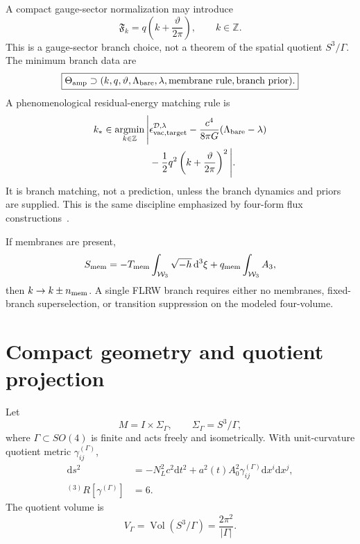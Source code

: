 \documentclass[
  aps,
  prd,
  reprint,
  superscriptaddress,
  floatfix,
  nofootinbib,
  longbibliography
]{revtex4-2}
\theoremstyle{plain}
\theoremstyle{definition}
\theoremstyle{remark}
\newcommand{\dd}{\mathrm d}
\newcommand{\D}{\mathcal D}
\newcommand{\Vol}{\operatorname{Vol}}
\newcommand{\Fcal}{\mathfrak F}
\newcommand{\Z}{\mathbb Z}
\begin{document}
A compact gauge-sector normalization may introduce
\begin{equation}
\boxed{
\Fcal_k=q\left(k+\frac{\vartheta}{2\pi}\right),
\qquad
k\in\Z.
}
\label{eq:flux_branch}
\end{equation}
This is a gauge-sector branch choice, not a theorem of the spatial quotient \(S^3/\Gamma\).  The minimum branch data are
\begin{equation}
\boxed{
\Theta_{\rm amp}\supset(k,q,\vartheta,\Lambda_{\rm bare},\lambda,
\text{membrane rule},\text{branch prior}).
}
\label{eq:branch_data}
\end{equation}
A phenomenological residual-energy matching rule is
\begin{equation}
\begin{aligned}
k_*\in\operatorname*{argmin}_{k\in\Z}
\Bigg|&\epsilon_{\rm vac,target}^{\D,\lambda}
-\frac{c^4}{8\pi G}(\Lambda_{\rm bare}-\lambda)\\
&-\frac12q^2\left(k+\frac{\vartheta}{2\pi}\right)^2\Bigg|.
\end{aligned}
\label{eq:branch_match}
\end{equation}
It is branch matching, not a prediction, unless the branch dynamics and priors are supplied.  This is the same discipline emphasized by four-form flux constructions~\cite{BrownTeitelboim1987,BoussoPolchinski2000}.

If membranes are present,
\begin{equation}
S_{\rm mem}=-T_{\rm mem}\int_{\mathcal W_3}\sqrt{-h}\,\dd^3\xi+q_{\rm mem}\int_{\mathcal W_3}A_3,
\end{equation}
then \(k\to k\pm n_{\rm mem}\).  A single FLRW branch requires either no membranes, fixed-branch superselection, or transition suppression on the modeled four-volume.

\section{Compact geometry and quotient projection}

Let
\begin{equation}
M=I\times\Sigma_\Gamma,
\qquad
\Sigma_\Gamma=S^3/\Gamma,
\label{eq:geometry}
\end{equation}
where \(\Gamma\subset SO(4)\) is finite and acts freely and isometrically.  With unit-curvature quotient metric \(\gamma^{(\Gamma)}_{ij}\),
\begin{equation}
\begin{aligned}
\dd s^2&=-N_L^2c^2\dd t^2
+a^2(t)A_0^2\gamma^{(\Gamma)}_{ij}\dd x^i\dd x^j,\\
{}^{(3)}R[\gamma^{(\Gamma)}]&=6.
\end{aligned}
\end{equation}
The quotient volume is
\begin{equation}
V_\Gamma=\Vol(S^3/\Gamma)=\frac{2\pi^2}{|\Gamma|}.
\end{equation}
\end{document}
